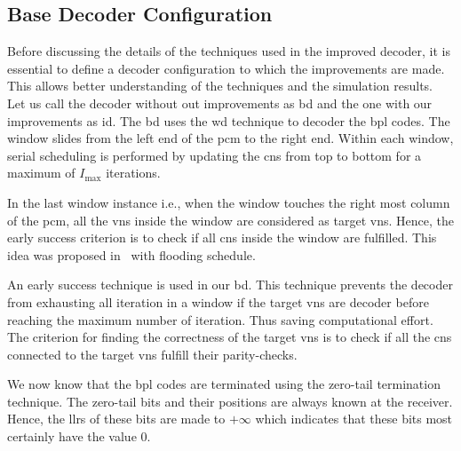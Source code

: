 \subsection{Base Decoder Configuration}
Before discussing the details of the techniques used in the improved decoder, it is essential to define a decoder configuration to which the improvements are made. This allows better understanding of the techniques and the simulation results. Let us call the decoder without out improvements as \ac{bd} and the one with our improvements as \ac{id}. The \ac{bd} uses the \ac{wd} technique to decoder the \ac{bpl} codes. The window slides from the left end of the \ac{pcm} to the right end. Within each window, serial scheduling is performed by updating the \acp{cn} from top to bottom for a maximum of $I_{\text{max}}$ iterations.

In the last window instance i.e., when the window touches the right most column of the \ac{pcm}, all the \acp{vn} inside the window are considered as target \acp{vn}. Hence, the early success criterion is to check if all \acp{cn} inside the window are fulfilled. This idea was proposed in~\cite{Ali2018} with flooding schedule.

An early success technique is used in our \ac{bd}. This technique prevents the decoder from exhausting all iteration in a window if the target \acp{vn} are decoder before reaching the maximum number of iteration. Thus saving computational effort. The criterion for finding the correctness of the target \acp{vn} is to check if all the \acp{cn} connected to the target \acp{vn} fulfill their parity-checks.

We now know that the \ac{bpl} codes are terminated using the zero-tail termination technique. The zero-tail bits and their positions are always known at the receiver. Hence, the \acp{llr} of these bits are made to $+\infty$ which indicates that these bits most certainly have the value 0.

